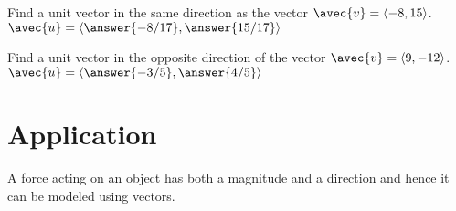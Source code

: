 \documentclass[handout]{ximera}
\begin{document}
\begin{problem}
Find a unit vector in the same direction as the vector $\avec{v} = \vector{-8, 15}$.\\
$\avec{u} = \vector{\answer{-8/17}, \answer{15/17}}$
\end{problem}

\begin{problem}
Find a unit vector in the opposite direction of the vector $\avec{v} = \vector{9, -12}$.\\
$\avec{u} = \vector{\answer{-3/5}, \answer{4/5}}$
\end{problem}

\section{Application}
A force acting on an object has both a magnitude and a direction and hence it can be modeled using vectors.
\end{document}
